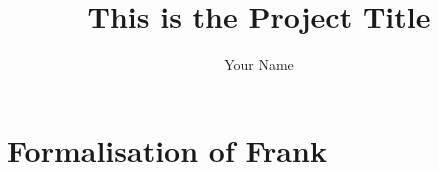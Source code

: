 \documentclass[msc,deptreport,cs]{infthesis} %
\begin{document}
\begin{preliminary}

\title{This is the Project Title}

\author{Your Name}


\maketitle



\end{preliminary}


\chapter{Formalisation of Frank}
\end{document}

